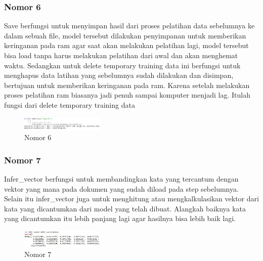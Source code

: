 \subsubsection{Nomor 6}
\hfill\break

Save berfungsi untuk menyimpan hasil dari proses pelatihan data sebelumnya ke dalam sebuah file, model tersebut dilakukan penyimpanan untuk memberikan keringanan pada ram agar saat akan melakukan pelatihan lagi, model tersebut bisa load tanpa harus melakukan pelatihan dari awal dan akan menghemat waktu. Sedangkan untuk delete temporary training data ini berfungsi untuk menghapus data latihan yang sebelumnya sudah dilakukan dan disimpan, bertujuan untuk memberikan keringanan pada ram. Karena setelah melakukan proses pelatihan ram biasanya jadi penuh sampai komputer menjadi lag. Itulah fungsi dari delete temporary training data
\begin{figure}[H]
\includegraphics[width=4cm]{figures/1174067/5/hasil6.jpg}
\centering
\caption{Nomor 6}
\end{figure}

\subsubsection{Nomor 7}
\hfill\break

Infer\_vector berfungsi untuk membandingkan kata yang tercantum dengan vektor yang mana pada dokumen yang sudah diload pada step sebelumnya. Selain itu infer\_vector juga untuk menghitung atau mengkalkulasikan vektor dari kata yang dicantumkan dari model yang telah dibuat. Alangkah baiknya kata yang dicantumkan itu lebih panjang lagi agar hasilnya bisa lebih baik lagi. 
\begin{figure}[H]
\includegraphics[width=4cm]{figures/1174067/5/hasil7.jpg}
\centering
\caption{Nomor 7}
\end{figure}

